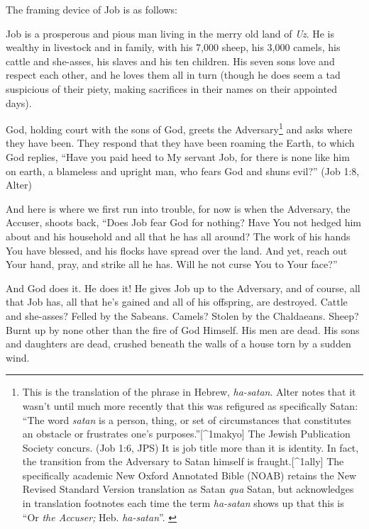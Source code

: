 The framing device of Job is as follows:

Job is a prosperous and pious man living in the merry old land of \emph{Uz}. He is wealthy in livestock and in family, with his 7,000 sheep, his 3,000 camels, his cattle and she-asses, his slaves and his ten children. His seven sons love and respect each other, and he loves them all in turn (though he does seem a tad suspicious of their piety, making sacrifices in their names on their appointed days).

God, holding court with the sons of God, greets the Adversary\footnote{This is the translation of the phrase in Hebrew, \emph{ha-satan}. Alter notes that it wasn't until much more recently that this was refigured as specifically Satan: ``The word \emph{satan} is a person, thing, or set of circumstances that constitutes an obstacle or frustrates one's purposes.''{[}\^{}1makyo{]} \parencite[466]{alter} The Jewish Publication Society concurs. (Job 1:6, JPS) It is job title more than it is identity. In fact, the transition from the Adversary to Satan himself is fraught.{[}\^{}1ally{]} The specifically academic New Oxford Annotated Bible (NOAB) retains the New Revised Standard Version translation as Satan \emph{qua} Satan, but acknowledges in translation footnotes each time the term \emph{ha-satan} shows up that this is ``Or \emph{the Accuser;} Heb. \emph{ha-satan}''. \parencite[736]{noab}} and asks where they have been. They respond that they have been roaming the Earth, to which God replies, ``Have you paid heed to My servant Job, for there is none like him on earth, a blameless and upright man, who fears God and shuns evil?'' (Job 1:8, Alter)

And here is where we first run into trouble, for now is when the Adversary, the Accuser, shoots back, ``Does Job fear God for nothing? Have You not hedged him about and his household and all that he has all around? The work of his hands You have blessed, and his flocks have spread over the land. And yet, reach out Your hand, pray, and strike all he has. Will he not curse You to Your face?''

And God does it. He does it! He gives Job up to the Adversary, and of course, all that Job has, all that he's gained and all of his offspring, are destroyed. Cattle and she-asses? Felled by the Sabeans. Camels? Stolen by the Chaldaeans. Sheep? Burnt up by none other than the fire of God Himself. His men are dead. His sons and daughters are dead, crushed beneath the walls of a house torn by a sudden wind.

